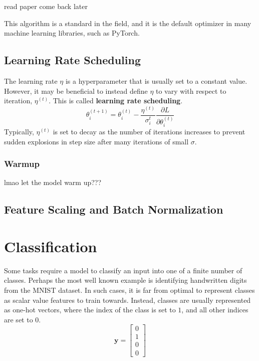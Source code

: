 \documentclass[12pt]{report}
\theoremstyle{definition}
\theoremstyle{remark}
\begin{document}
read paper come back later

This algorithm is a standard in the field, and it is the default optimizer in many machine learning libraries, such as PyTorch.

\subsection{Learning Rate Scheduling}

The learning rate $\eta$ is a hyperparameter that is usually set to a constant value. However, it may be beneficial to instead define $\eta$ to vary with respect to iteration, $\eta^{(t)}$. This is called \textbf{learning rate scheduling}.
\begin{equation}
    \theta_{i}^{(t+1)} = \theta_{i}^{(t)} - \frac{\eta^{(t)}}{\sigma_i^t}\frac{\partial L}{\partial \theta_i^{(t)}}
\end{equation}
Typically, $\eta^{(t)}$ is set to decay as the number of iterations increases to prevent sudden explosions in step size after many iterations of small $\sigma$.

\subsubsection{Warmup}

lmao let the model warm up???

\subsection{Feature Scaling and Batch Normalization}

\section{Classification}\label{sec:classification}
Some tasks require a model to classify an input into one of a finite number of classes. Perhaps the most well known example is identifying handwritten digits from the MNIST dataset. In such cases, it is far from optimal to represent classes as scalar value features to train towards. Instead, classes are usually represented as one-hot vectors, where the index of the class is set to $1$, and all other indices are set to $0$.
\begin{equation}
    \mathbf{y} = \begin{bmatrix}
        0 \\
        1 \\
        0 \\
        0
    \end{bmatrix}
\end{equation}
\end{document}
